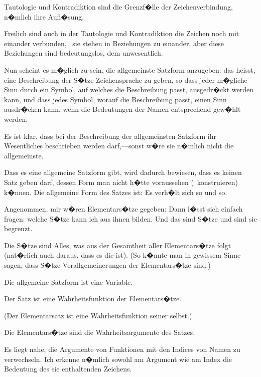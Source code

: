 \begin{propositions}
{Tautologie und Kontradiktion sind die Grenzf�lle
der Zeichenverbindung, n�mlich ihre Aufl�sung.}


{Freilich sind auch in der Tautologie und Kontradiktion
die Zeichen noch mit einander verbunden,
\dasHeiszt\ sie stehen in Beziehungen zu einander,
aber diese Beziehungen sind bedeutungslos, dem
 unwesentlich.}


{Nun scheint es m�glich zu sein, die allgemeinste
Satzform anzugeben: das heisst, eine Beschreibung
der S�tze  Zeichensprache zu geben,
so dass jeder m�gliche Sinn durch ein Symbol,
auf welches die Beschreibung passt, ausgedr�ckt
werden kann, und dass jedes Symbol, worauf die
Beschreibung passt, einen Sinn ausdr�cken kann,
wenn die Bedeutungen der Namen entsprechend
gew�hlt werden.

Es ist klar, dass bei der Beschreibung der
allgemeinsten Satzform  ihr Wesentliches
beschrieben werden darf,---sonst w�re sie n�mlich
nicht die allgemeinste.

Dass es eine allgemeine Satzform gibt, wird
dadurch bewiesen, dass es keinen Satz geben darf,
dessen Form man nicht h�tte voraussehen (\dasHeiszt\ konstruieren)
k�nnen. Die allgemeine Form des
Satzes ist: Es verh�lt sich so und so.}


{Angenommen, mir w�ren  Elementars�tze
gegeben: Dann l�sst sich einfach fragen: welche
S�tze kann ich aus ihnen bilden. Und das sind
 S�tze und  sind sie begrenzt.}


{Die S�tze sind Alles, was aus der Gesamtheit
aller Elementars�tze folgt (nat�rlich auch daraus,
dass es die  ist). (So k�nnte
man in gewissem Sinne sagen, dass  S�tze
Verallgemeinerungen der Elementars�tze sind.)}


{Die allgemeine Satzform ist eine Variable.}


{Der Satz ist eine Wahrheitsfunktion der Elementars�tze.

(Der Elementarsatz ist eine Wahrheitsfunktion
seiner selbst.)}


{Die Elementars�tze sind die Wahrheitsargumente
des Satzes.}


{Es liegt nahe, die Argumente von Funktionen
mit den Indices von Namen zu verwechseln. Ich
erkenne n�mlich sowohl am Argument wie am
Index die Bedeutung des sie enthaltenden Zeichens.

}
\end{propositions}
